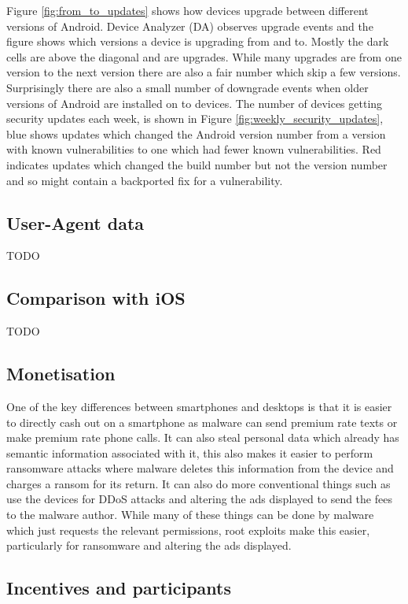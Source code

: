 \documentclass[conference,a4paper,twoside]{IEEEtran}
\begin{document}
Figure \ref{fig:from_to_updates} shows how devices upgrade between different versions of Android.
Device Analyzer (DA) observes upgrade events and the figure shows which versions a device is upgrading from and to.
Mostly the dark cells are above the diagonal and are upgrades.
While many upgrades are from one version to the next version there are also a fair number which skip a few versions.
Surprisingly there are also a small number of downgrade events when older versions of Android are installed on to devices.
The number of devices getting security updates each week, is shown in Figure \ref{fig:weekly_security_updates}, blue shows updates which changed the Android version number from a version with known vulnerabilities to one which had fewer known vulnerabilities.
Red indicates updates which changed the build number but not the version number and so might contain a backported fix for a vulnerability.




\subsection{User-Agent data}
TODO

\subsection{Comparison with iOS}
TODO

\subsection{Monetisation}
One of the key differences between smartphones and desktops is that it is easier to directly cash out on a smartphone as malware can send premium rate texts or make premium rate phone calls.
It can also steal personal data which already has semantic information associated with it, this also makes it easier to perform ransomware attacks where malware deletes this information from the device and charges a ransom for its return.
It can also do more conventional things such as use the devices for DDoS attacks and altering the ads displayed to send the fees to the malware author.
While many of these things can be done by malware which just requests the relevant permissions, root exploits make this easier, particularly for ransomware and altering the ads displayed.

\subsection{Incentives and participants}
\label{sec:economics}
\cite{Felt2011}
\end{document}
